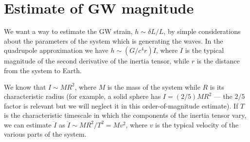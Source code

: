 \documentclass[main.tex]{subfiles}
\begin{document}



\section{Estimate of GW magnitude}

We want a way to estimate the GW strain, \(h \sim \delta L / L\), by simple considerations about the parameters of the system which is generating the waves. 
In the quadrupole approximation we have \(h \sim (G / c^{4} r) \ddot{I}\), where \(\ddot{I}\) is the typical magnitude of the second derivative of the inertia tensor, while \(r\) is the distance from the system to Earth. 

We know that \(I \sim M R^2\), where \(M\) is the mass of the system while \(R\) is its characteristic radius (for example, a solid sphere has \(I = (2/5)  M R^2 \) --- the \(2/5\) factor is relevant but we will neglect it in this order-of-magnitude estimate).
If \(T\) is the characteristic timescale in which the components of the inertia tensor vary, we can estimate \(\ddot{I}\) as \(\ddot{I} \sim M R^2 / T^2 = M v^2\), where \(v\) is the typical velocity of the various parts of the system. 
\end{document}
